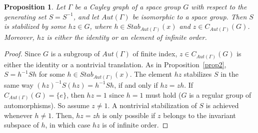 \documentclass[10pt,a4paper]{amsart}
\newtheorem{prop}{Proposition}
\begin{document}
\begin{prop}
\label{prop4}
Let $\Gamma$ be a Cayley graph of a space group $G$ with respect to the generating set $S = S^{-1}$, and let $Aut(\Gamma)$ be isomorphic to a space group. Then $S$ is stabilized by some $hz \in G$, where $h \in Stab_{Aut(\Gamma)}(x)$ and $z \in C_{Aut(\Gamma)}(G)$. Moreover, $hz$ is either the identity or an element of infinite order.
\end{prop}

\begin{proof} Since $G$ is a subgroup of $Aut(\Gamma)$ of finite index, $z \in C_{Aut(\Gamma)}(G)$ is either the identity or a nontrivial translation. As in Proposition~\ref{prop2}, $S = h^{-1}Sh$ for some $h \in Stab_{Aut(\Gamma)}(x)$. The element $hz$ stabilizes $S$ in the same way $(hz)^{-1}S(hz) = h^{-1}Sh$, if and only if $hz = zh$. If $C_{Aut(\Gamma)}(G) = \{e\}$, then $hz = 1$  since $h = 1$ must hold ($G$ is a regular group of automorphisms). So assume $z \neq 1$. A nontrivial stabilization of $S$ is achieved whenever $h \neq 1$. Then, $hz=zh$ is only possible if $z$ belongs to the invariant subspace of $h$, in which case $hz$ is of infinite order.
\end{proof}
\end{document}
